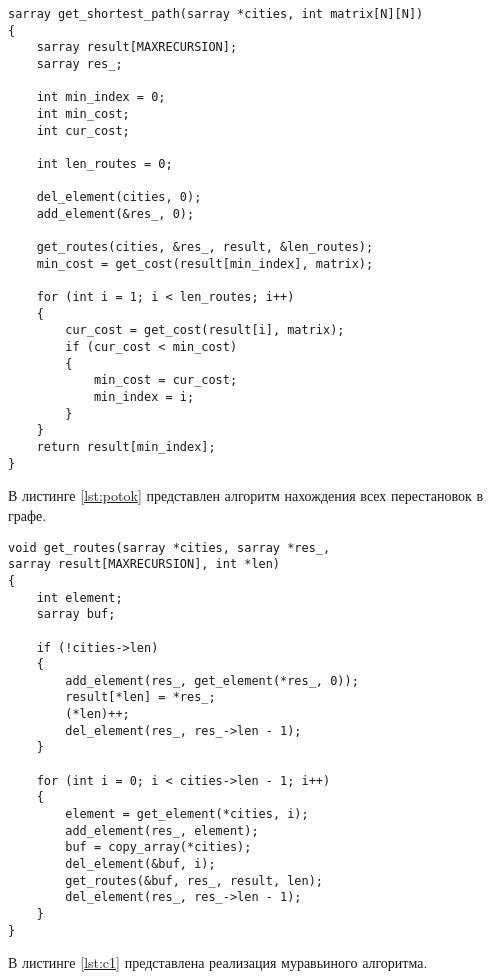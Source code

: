 \captionsetup{singlelinecheck = false, justification=raggedright}
\begin{lstlisting}[label=lst:con,caption=Реализация алгоритма полного перебора]
sarray get_shortest_path(sarray *cities, int matrix[N][N])
{
    sarray result[MAXRECURSION];
    sarray res_;

    int min_index = 0;
    int min_cost;
    int cur_cost;
    
    int len_routes = 0;
	
    del_element(cities, 0);
    add_element(&res_, 0);

    get_routes(cities, &res_, result, &len_routes);
    min_cost = get_cost(result[min_index], matrix);

    for (int i = 1; i < len_routes; i++)
    {
        cur_cost = get_cost(result[i], matrix);
        if (cur_cost < min_cost)
        {
            min_cost = cur_cost;
            min_index = i;
        }
    }
    return result[min_index];
}
\end{lstlisting}

В листинге \ref{lst:potok} представлен алгоритм нахождения всех перестановок в графе.

\begin{lstlisting}[label=lst:potok,caption=Реализация алгоритма нахождения всех перестановок в графе]
void get_routes(sarray *cities, sarray *res_,
sarray result[MAXRECURSION], int *len)
{
	int element;
	sarray buf;
	
	if (!cities->len)
	{
		add_element(res_, get_element(*res_, 0));
		result[*len] = *res_;
		(*len)++;
		del_element(res_, res_->len - 1);
	}

	for (int i = 0; i < cities->len - 1; i++)
	{
		element = get_element(*cities, i);
		add_element(res_, element);
		buf = copy_array(*cities);
		del_element(&buf, i);
		get_routes(&buf, res_, result, len);
		del_element(res_, res_->len - 1);
	}
}
\end{lstlisting}

В листинге \ref{lst:c1} представлена реализация муравьиного алгоритма.

